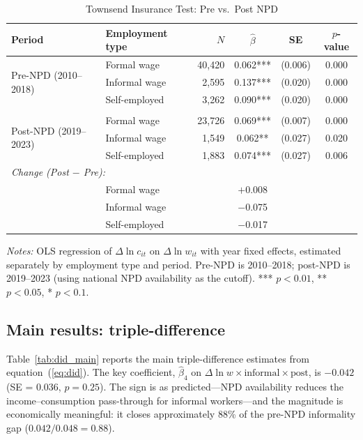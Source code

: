 \documentclass[12pt]{article}
\begin{document}
\begin{table}[htbp]
\centering
\caption{Townsend Insurance Test: Pre vs.\ Post NPD}
\label{tab:townsend_period}
\small
\begin{tabular}{llrccc}
\toprule
Period & Employment type & $N$ & $\hat{\beta}$ & SE & $p$-value \\
\midrule
\multirow{3}{*}{Pre-NPD (2010--2018)}
 & Formal wage & 40,420 & 0.062*** & (0.006) & 0.000 \\
 & Informal wage & 2,595 & 0.137*** & (0.020) & 0.000 \\
 & Self-employed & 3,262 & 0.090*** & (0.020) & 0.000 \\
\\
\multirow{3}{*}{Post-NPD (2019--2023)}
 & Formal wage & 23,726 & 0.069*** & (0.007) & 0.000 \\
 & Informal wage & 1,549 & 0.062** & (0.027) & 0.020 \\
 & Self-employed & 1,883 & 0.074*** & (0.027) & 0.006 \\
\midrule
\multicolumn{6}{l}{\textit{Change (Post $-$ Pre):}} \\
 & Formal wage & & $+$0.008 & & \\
 & Informal wage & & $-$0.075 & & \\
 & Self-employed & & $-$0.017 & & \\
\bottomrule
\end{tabular}
\begin{minipage}{0.9\textwidth}
\vspace{0.3em}
\footnotesize \textit{Notes:} OLS regression of $\Delta \ln c_{it}$ on $\Delta \ln w_{it}$ with year fixed effects, estimated separately by employment type and period. Pre-NPD is 2010--2018; post-NPD is 2019--2023 (using national NPD availability as the cutoff). *** $p < 0.01$, ** $p < 0.05$, * $p < 0.1$.
\end{minipage}
\end{table}

\subsection{Main results: triple-difference}

Table~\ref{tab:did_main} reports the main triple-difference estimates from equation~(\ref{eq:did}). The key coefficient, $\hat{\beta}_4$ on $\Delta \ln w \times \text{informal} \times \text{post}$, is $-0.042$ (SE = 0.036, $p = 0.25$). The sign is as predicted---NPD availability reduces the income--consumption pass-through for informal workers---and the magnitude is economically meaningful: it closes approximately 88\% of the pre-NPD informality gap ($0.042 / 0.048 = 0.88$).
\end{document}
